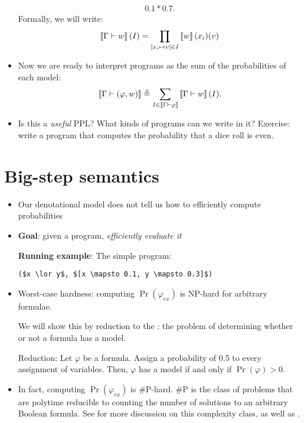 \documentclass{tufte-handout}
\begin{document}
\begin{itemize}
\begin{align*}
    0.1 * 0.7.
  \end{align*}
  Formally, we will write:
  \begin{align}
    \left \llbracket {\Gamma \vdash w} \right \rrbracket(I) = \prod_{[x_i \mapsto v] \in I}\left \llbracket {w} \right \rrbracket(x_i)(v)
  \end{align}
  \item Now we are ready to interpret \prop{} programs as the sum of the probabilities 
  of each model:
  \begin{align}
    \left \llbracket {\Gamma \vdash (\varphi, w)} \right \rrbracket \triangleq \sum_{I \in \left \llbracket {\Gamma \vdash \varphi} \right \rrbracket} \left \llbracket {\Gamma \vdash w} \right \rrbracket(I).
  \end{align}
\end{itemize}

\begin{itemize}
  \item Is this a \emph{useful} PPL? What kinds of programs 
  can we write in it? Exercise: write a \prop{} program that 
  computes the probability that a dice roll is even.
\end{itemize}

\section{Big-step semantics}
\begin{itemize}
  \item Our denotational model does not tell us how to efficiently compute probabilities
  \item \textbf{Goal}: given a \prop{} program, \emph{efficiently evaluate it}

    \textbf{Running example}: The simple \prop{} program:
\begin{lstlisting}[mathescape=true]
($x \lor y$, $[x \mapsto 0.1, y \mapsto 0.3]$)
\end{lstlisting}

    \item Worst-case hardness: computing $\Pr(\varphi_{ex})$ is NP-hard for 
    arbitrary formulae.

    We will show this by reduction to the : the problem of
    determining whether or not a formula has a model.

    Reduction: Let $\varphi$ be a formula. Assign a probability of 0.5 to 
    every assignment of variables. Then, $\varphi$ has a model if and 
    only if $\Pr(\varphi) > 0$.
    
    \item In fact, computing $\Pr(\varphi_{ex})$ is \#P-hard. 
    \#P is the class of problems that are polytime reducible to counting 
    the number of solutions to an arbitrary Boolean formula.
    See \citet[Chapter
    6]{goldreich2008computational} for more discussion on this complexity class, 
    as well as \citet{roth1996hardness}.
\end{itemize}
\end{document}
